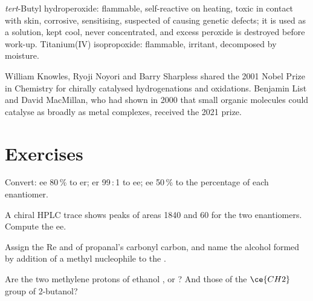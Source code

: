 \begin{safety}{}
\textit{tert}-Butyl hydroperoxide: flammable, self-reactive on heating, toxic in contact with
skin, corrosive, sensitising, suspected of causing genetic defects; it is used
as a solution, kept cool, never concentrated, and excess peroxide is destroyed
before work-up. Titanium(IV) isopropoxide: flammable, irritant, decomposed by
moisture.
\end{safety}

\begin{history}
William Knowles, Ryoji Noyori and Barry Sharpless shared the 2001 Nobel Prize
in Chemistry for chirally catalysed hydrogenations and oxidations. Benjamin List
and David MacMillan, who had shown in 2000 that small organic molecules could
catalyse  as broadly as metal complexes, received
the 2021 prize.
\end{history}

\section{Exercises}

\begin{exercise}[$\star$]\label{exo:b3:asymmetric-synthesis:1}
Convert: ee 80\,\% to er; er 99\,:\,1 to ee; ee 50\,\% to the percentage of each
enantiomer.
\end{exercise}

\begin{exercise}[$\star$]\label{exo:b3:asymmetric-synthesis:2}
A chiral HPLC trace shows peaks of areas 1840 and 60 for the two enantiomers.
Compute the ee.
\end{exercise}

\begin{exercise}[$\star$]\label{exo:b3:asymmetric-synthesis:3}
Assign the Re and  of propanal's carbonyl carbon, and name the alcohol
formed by addition of a methyl nucleophile to the .
\end{exercise}

\begin{exercise}[$\star$]\label{exo:b3:asymmetric-synthesis:4}
Are the two methylene protons of ethanol ,  or ?
And those of the $\ce{CH2}$ group of 2-butanol?
\end{exercise}

